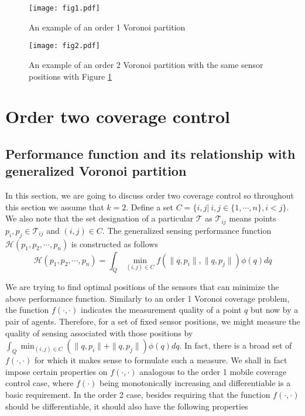 \documentclass[letterpaper, 10 pt, conference]{ieeeconf}
\begin{document}
\begin{figure}[!ht]
\begin{center}
\texttt{[image: fig1.pdf]}
\end{center}
\caption{An example of an order 1 Voronoi partition}
\label{fig1}
\end{figure}
\begin{figure}[!ht]
\begin{center}
\texttt{[image: fig2.pdf]}
\end{center}
\caption{An example of an order 2 Voronoi partition with the same sensor positions with Figure \ref{fig1}}
\label{fig2}
\end{figure}

\section{Order two coverage control}
\label{order two section}
\subsection{Performance function and its relationship with generalized Voronoi partition}
In this section, we are going to discuss order two coverage control so throughout this section we assume that $k=2$. Define a set $C=\{i,j|~i,j\in\{1,\cdots,n\},i < j\}$. We also note that the set designation of a particular $\mathcal{T}$ as $\mathcal{T}_{ij}$ means points $p_i,p_j \in \mathcal{T}_{ij}$ and $(i,j)\in C$.
The generalized sensing performance function $\mathcal{H}(p_1, p_2,\cdots,p_n)$ is constructed  as follows
\begin{equation}
\label{double cover}
\mathcal{H}(p_1, p_2,\cdots,p_n)=\int_Q \min_{(i,j)\in C} f(\|q,p_i\|,\|q,p_j\|) \phi(q) dq
\end{equation}


We are trying to find optimal positions of the sensors that can minimize the above performance function.
Similarly to an order 1 Voronoi coverage problem, the function $f(\cdot, \cdot)$  indicates the measurement quality of a point $q$ but now by a pair of agents.
Therefore, for a set of fixed sensor positions, we might measure the quality of sensing associated with those positions by $\int_Q \min_{(i,j)\in C} (\|q,p_i\|+\|q,p_j\|) \phi(q) dq$.  In fact, there is a broad set of $f(\cdot, \cdot)$ for which it makes sense to formulate such a measure. We shall in fact impose certain properties on $f(\cdot, \cdot)$
analogous to the order 1 mobile coverage control case, where $f(\cdot)$ being monotonically increasing and differentiable is a basic requirement. In the order 2 case, besides requiring that the function $f(\cdot, \cdot)$ should be differentiable, it should also have the following properties
\end{document}
